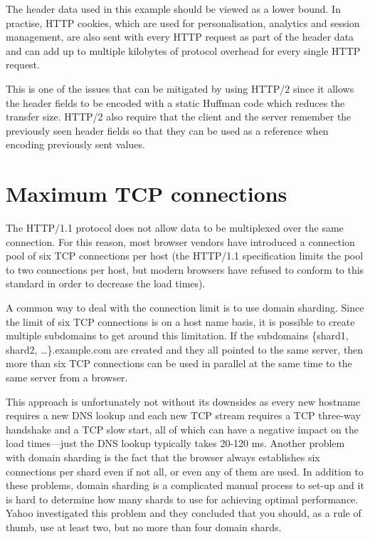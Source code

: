 \documentclass{cslthse-msc}
\begin{document}
The header data used in this example should be viewed as a lower bound. In practise, HTTP cookies, which are used for personalisation, analytics and session management, are also sent with every HTTP request as part of the header data and can add up to multiple kilobytes of protocol overhead for every single HTTP request\cite[page 200]{HPBN}.

This is one of the issues that can be mitigated by using HTTP/2 since it allows the header fields to be encoded with a static Huffman code which reduces the transfer size. HTTP/2 also require that the client and the server remember the previously seen header fields so that they can be used as a reference when encoding previously sent values\cite[page 19]{hpbn2}.

\section{Maximum TCP connections}
\label{max_tcp}
The HTTP/1.1 protocol does not allow data to be multiplexed over the same connection\cite[p.194]{HPBN}. For this reason, most browser vendors have introduced a connection pool of six TCP connections per host (the HTTP/1.1 specification limits the pool to two connections\cite{rfc2616} per host, but modern browsers have refused to conform to this standard in order to decrease the load times).

A common way to deal with the connection limit is to use domain sharding. Since the limit of six TCP connections is on a host name basis, it is possible to create multiple subdomains to get around this limitation. If the subdomains \{shard1, shard2, \ldots\}.example.com are created and they all pointed to the same server, then more than six TCP connections can be used in parallel at the same time to the same server from a browser.

This approach is unfortunately not without its downsides as every new hostname requires a new DNS lookup and each new TCP stream requires a TCP three-way handshake and a TCP slow start, all of which can have a negative impact on the load times\cite[page 199]{HPBN}---just the DNS lookup typically takes 20-120 ms\cite[page 63]{HPWS}. Another problem with domain sharding is the fact that the browser always establishes six connections per shard even if not all, or even any of them are used. In addition to these problems, domain sharding is a complicated manual process to set-up and it is hard to determine how many shards to use for achieving optimal performance. Yahoo investigated this problem and they concluded that you should, as a rule of thumb, use at least two, but no more than four domain shards\cite{yahoo-performance-4}.
\end{document}

